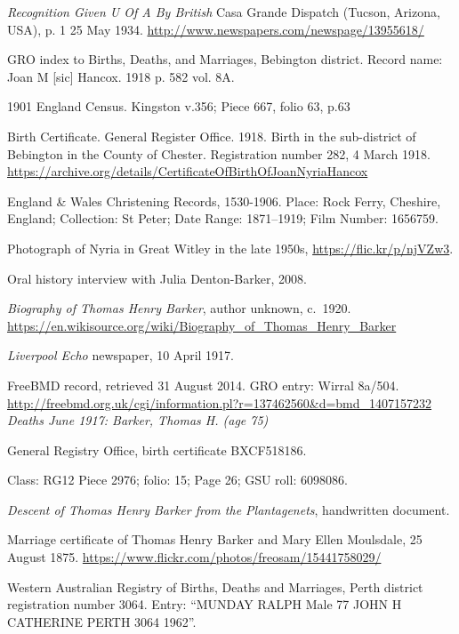 \begin{thebibliography}{99}
	\emph{Recognition Given U Of A By British}
	Casa Grande Dispatch (Tucson, Arizona, USA), p. 1 25 May 1934. \url{http://www.newspapers.com/newspage/13955618/}

	GRO index to Births, Deaths, and Marriages,
	Bebington district. Record name: Joan M [sic] Hancox.
	1918 p. 582 vol. 8A.

	1901 England Census. Kingston v.356; Piece 667, folio 63, p.63

	Birth Certificate. General Register Office.
	1918. Birth in the sub-district of Bebington in the County of Chester.
	Registration number 282, 4 March 1918.
	\url{https://archive.org/details/CertificateOfBirthOfJoanNyriaHancox}

	England \& Wales Christening Records, 1530-1906.
	Place: Rock Ferry, Cheshire, England; Collection: St Peter;
	Date Range: 1871--1919; Film Number: 1656759.

	Photograph of Nyria in Great Witley in the late 1950s,
	\url{https://flic.kr/p/njVZw3}.

	Oral history interview with Julia Denton-Barker, 2008.

	\emph{Biography of Thomas Henry Barker}, author unknown, c.\ 1920.
	\url{https://en.wikisource.org/wiki/Biography_of_Thomas_Henry_Barker}

	\emph{Liverpool Echo} newspaper, 10 April 1917.

	FreeBMD record, retrieved 31 August 2014. GRO entry: Wirral 8a/504.
	\url{http://freebmd.org.uk/cgi/information.pl?r=137462560&d=bmd_1407157232}
	\emph{Deaths June 1917: Barker, Thomas H. (age 75)}

	General Registry Office, birth certificate BXCF518186.

	Class: RG12 Piece 2976; folio: 15; Page 26; GSU roll: 6098086.

	\emph{Descent of Thomas Henry Barker from the Plantagenets},
	handwritten document.

	Marriage certificate of Thomas Henry Barker and Mary Ellen Moulsdale, 25 August 1875.
	\url{https://www.flickr.com/photos/freosam/15441758029/}

	 Western Australian Registry of Births, Deaths and Marriages, Perth district registration number 3064.
	 Entry: ``MUNDAY RALPH 	Male 	77 	JOHN H 	CATHERINE 		PERTH 	3064 	1962''.


\end{thebibliography}
